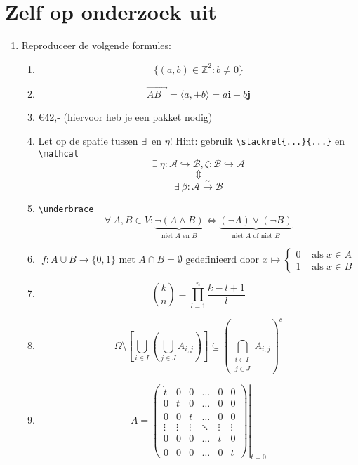 \documentclass{article}
\begin{document}
\section{Zelf op onderzoek uit}
\begin{enumerate}
	\item Reproduceer de volgende formules:
	\begin{enumerate}
		\item \[  \{(a,b) \in \mathbb{Z}^2 : b \neq 0\} \]
		\item \[\overrightarrow{AB_{\pm}} = \langle a, \pm b \rangle = a\mathbf{i} \pm b\mathbf{j}\]
		\item \euro 42,- (hiervoor heb je een pakket nodig)
		\item Let op de spatie tussen \textquotesingle\(\exists\)\textquotesingle \ en \textquotesingle\(\eta\)\textquotesingle! Hint: gebruik \verb|\stackrel{...}{...}| en \verb.\mathcal.
			\[\exists \ \eta :\mathcal{A} \hookrightarrow \mathcal{B}, \zeta : \mathcal{B} \hookrightarrow \mathcal{A}\]
			\[\Updownarrow\]
			\[\exists \ \beta : \mathcal{A} \stackrel{\sim}{\longrightarrow} \mathcal{B}\]
		\item \verb+\underbrace+
			\[\forall \ A, B \in V :  \underbrace{\neg(A \wedge B)}_{\text{niet } A \text{ en } B} \Longleftrightarrow \underbrace{(\neg A) \vee (\neg B)}_{\text{niet } A \text{ of niet } B}\]
		\item 			\[f : A \cup B \to \{0,1\} \text{ met } A \cap B = \emptyset \text{ gedefinieerd door } x \mapsto \begin{cases} 0 & \text{ als } x \in A\\1 & \text{ als } x \in B \end{cases}\]
		\item 
			\[\binom{k}{n} = \prod_{l = 1}^n\frac{k-l+1}{l}\]
		\item	
			\[\Omega \setminus \left[\bigcup_{i \in I}\left(\bigcup_{j \in J} A_{i,j} \right)\right] \subseteq \left(\bigcap_{\begin{smallmatrix} i \in I \\ j \in J \end{smallmatrix}} A_{i,j}\right)^c\]
		\item
			\[A = \left.\left(
			\begin{array}{cccccc}
				\dot{t} 	& 0 		& 0		& \ldots 	& 0 		& 0\\
				0 		& t 		& 0		& \ldots 	& 0 		& 0\\
				0 		& 0 		& \dot{t} & \ldots 	& 0 		& 0\\
				\vdots 	& \vdots 	& \vdots 	& \ddots 	& \vdots 	& \vdots \\
				0 		& 0 		& 0 		& \ldots 	& t 		& 0\\
				0 		& 0 		& 0 		& \ldots 	& 0 		& \dot{t}
			\end{array}\right)\right|_{t = 0}\]
	\end{enumerate}
\end{enumerate}
  
\end{document}
